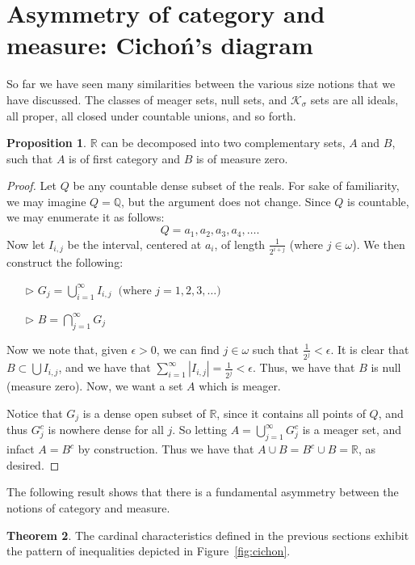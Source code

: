 \documentclass[11pt,oneside]{amsart}
\newcommand{\QQ}{\mathbb Q}
\newcommand{\RR}{\mathbb R}
\theoremstyle{definition}
\newtheorem{thm}{Theorem}[section]
\newtheorem{prop}[thm]{Proposition}
\theoremstyle{definition}
\theoremstyle{remark}
\begin{document}
\section{Asymmetry of category and measure: Cicho\'n's diagram}

So far we have seen many similarities between the various size notions that we have discussed. The classes of meager sets, null sets, and $\mathcal K_\sigma$ sets are all ideals, all proper, all closed under countable unions, and so forth.

\begin{prop}
  $\RR$ can be decomposed into two complementary sets, $A$ and $B$, such that  $A$ is of first category and $B$ is of measure zero. 
\end{prop}

\begin{proof}
  Let $Q$ be any countable dense subset of the reals. For sake of familiarity, we may imagine $Q=\QQ$, but the argument does not change. Since $Q$ is countable, we may enumerate it as follows:
		$$Q=a_1, a_2, a_3, a_4, \hdots.$$
Now let $I_{i,j}$ be the interval, centered at $a_i$, of length $\frac{1}{2^{i+j}}$ (where $j\in \omega$). We then construct the following:
	\begin{itemize}
		\item[$\triangleright$]{ $G_{j}=\bigcup_{i=1}^\infty I_{i,j}\;\; \text{(where } j=1,2,3,\hdots)$}
		\item[$\triangleright$]{ $B= \bigcap_{j=1}^\infty G_j$}
	\end{itemize}
Now we note that, given $\epsilon>0$, we can find $j\in \omega$ such that $\frac{1}{2^j}<\epsilon$. It is clear that $B\subset \bigcup I_{i,j}$, and we have that $\sum_{i=1}^\infty \left| I_{i,j}\right|= \frac{1}{2^j}<\epsilon$. Thus, we have that $B$ is null (measure zero). Now, we want a set $A$ which is meager. 

Notice that $G_j$ is a dense open subset of $\RR$, since it contains all points of $Q$, and thus $G_j^c$ is nowhere dense for all $j$. So letting $A=\bigcup_{j=1}^\infty G_j^c$ is a meager set, and infact $A=B^c$ by construction. Thus we have that $A\cup B=B^c\cup B=\RR$, as desired.
\end{proof}

The following result shows that there is a fundamental asymmetry between the notions of category and measure.

\begin{thm}
  The cardinal characteristics defined in the previous sections exhibit the pattern of inequalities depicted in Figure~\ref{fig:cichon}.
\end{thm}
\end{document}
